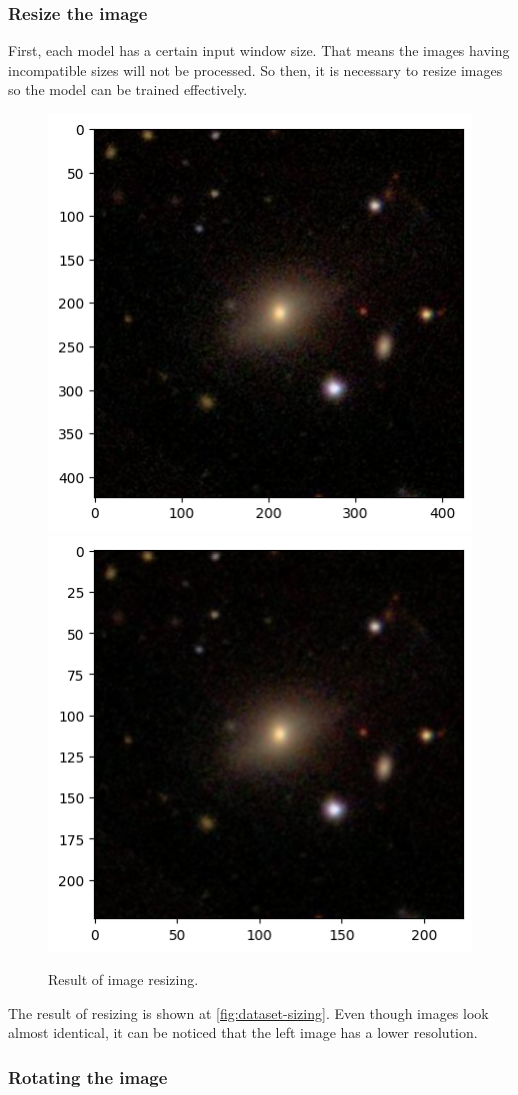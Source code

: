 \subsubsection*{Resize the image}

First, each model has a certain input window size. That means the images having incompatible sizes will not be processed. So then, it is necessary to resize images so the model can be trained effectively. 

\begin{figure}[htbp]\centering
  \centering
  \includegraphics[width=0.5\linewidth]{obrazky-figures/03-dataset/orig.png}\hfill
  \includegraphics[width=0.5\linewidth]{obrazky-figures/03-dataset/resize.png}
  \caption{Result of image resizing.}
  \label{fig:dataset-sizing}
\end{figure}

The result of resizing is shown at \autoref{fig:dataset-sizing}. Even though images look almost identical, it can be noticed that the left image has a lower resolution.

\subsubsection*{Rotating the image}

